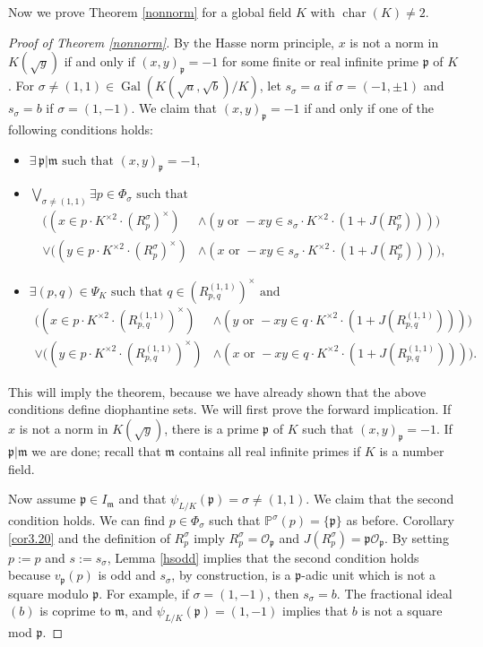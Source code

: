 \documentclass[12pt,reqno]{amsart}
\newcommand{\mm}{\mathfrak{m}}
\newcommand{\OO}{\mathcal{O}}
\newcommand{\pp}{\mathfrak{p}}
\newcommand{\PP}{\mathbb{P}}
\DeclareMathOperator{\Gal}{Gal}
\DeclareMathOperator{\ch}{char}
\theoremstyle{definition}
\begin{document}
Now we prove Theorem \ref{nonnorm} for a global field $K$ with $\ch(K)\not=2$.

\begin{proof}[Proof of Theorem \ref{nonnorm}]
  By the Hasse norm principle, $x$
  is not a norm in $K(\sqrt{y})$ if and only if $(x,y)_{\pp}=-1$ for
  some finite or real infinite prime $\pp$ of $K$. For $\sigma\not=(1,1)\in
  \Gal(K(\sqrt{a},\sqrt{b})/K)$, let $s_{\sigma}=a$ if
  $\sigma=(-1,\pm1)$ and $s_{\sigma}=b$ if $\sigma=(1,-1)$. We claim
  that $(x,y)_{\pp}=-1$ if and only if one of the following conditions
  holds:

\begin{itemize}
\item $\exists\, \pp|\mm \text{ such that } (x,y)_{\pp}=-1$,
\item $\bigvee_{\sigma\not=(1,1)} \exists p \in \Phi_{\sigma} \text{ such that}$
\begin{align*}
\big((x\in p \cdot K^{\times2} \cdot (R_{p}^{\sigma})^{\times}) &\land (y \text{ or } -xy \in s_{\sigma} \cdot K^{\times2} \cdot (1+J(R^{\sigma}_p)))\big) \\ 
\lor \big((y\in p \cdot K^{\times2} \cdot (R_{p}^{\sigma})^{\times}) &\land (x \text{ or } -xy \in s_{\sigma} \cdot K^{\times2} \cdot (1+J(R^{\sigma}_p)))\big),
\end{align*}
\item $\exists(p,q)\in \Psi_K \text{ such that } q\in (R^{(1,1)}_{p,q})^{\times} \text{ and }$ 
\begin{align*}
\big((x\in p \cdot K^{\times2} \cdot (R_{p,q}^{(1,1)})^{\times}) &\land (y \text{ or } -xy \in q \cdot K^{\times2} \cdot (1+J(R^{(1,1)}_{p,q})))\big) \\ 
\lor\big((y\in p \cdot K^{\times2} \cdot (R_{p,q}^{(1,1)})^{\times}) &\land (x \text{ or } -xy \in q \cdot K^{\times2} \cdot (1+J(R^{(1,1)}_{p,q})))\big).
\end{align*}

\end{itemize}


This will imply the theorem, because we have already shown that the above conditions define diophantine sets. We will first prove the forward implication. If $x$ is not a norm in
$K(\sqrt{y})$, there is a prime $\pp$ of $K$ such that
$(x,y)_{\pp}=-1$. If $\pp|\mm$ we are
done; recall that $\mm$ contains all real infinite primes if $K$ is a
number field.

Now assume $\pp \in I_{\mm}$ and that $\psi_{L/K}(\pp)=\sigma\not=(1,1)$. We
claim that the second condition holds. We can find $p\in \Phi_{\sigma}$
such that $\PP^{\sigma}(p)=\{\pp\}$ as before. Corollary \ref{cor3.20} and the definition of $R_p^{\sigma}$ imply
$R_p^{\sigma}=\OO_{\pp}$ and $J(R_p^{\sigma})=\pp\OO_{\pp}$. By setting $p:=p$ and $s:=s_{\sigma}$, Lemma
\ref{hsodd} implies that the second condition holds because $v_{\pp}(p)$ is odd
and $s_{\sigma}$, by construction, is a $\pp$-adic unit which is not a square modulo
$\pp$. For example, if $\sigma=(1,-1)$, then $s_{\sigma}=b$. The fractional ideal $(b)$ is coprime to $\mm$, and $\psi_{L/K}(\pp)=(1,-1)$ implies that $b$ is not a square mod $\pp$. 


\end{proof}
\end{document}
